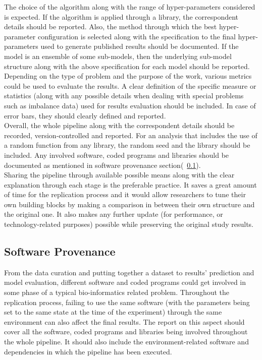     The choice of the algorithm along with the range of hyper-parameters considered is expected. If the algorithm is applied through 
    a library, the correspondent details should be reported. Also, the method through which the best hyper-parameter configuration 
    is selected along with the specification to the final hyper-parameters used to generate published results should be documented. 
    If the model is an ensemble of some sub-models, then the underlying sub-model structure along with the above specification for each model 
    should be reported.\\

    Depending on the type of problem and the purpose of the work, various metrics could be used to evaluate the results. 
    A clear definition of the specific measure or statistics (along with any possible details when dealing with special problems
    such as imbalance data) used for results evaluation should be included. In case of error bars, they should clearly defined and reported.\\

    Overall, the whole pipeline along with the correspondent details should be recorded, version-controlled and reported. For an analysis 
    that includes the use of a random function from any library, the random seed and the library should be included. Any involved 
    software, coded programs and libraries should be documented as mentioned in software provenance 
    section(~\ref{sec:softwareProvenance}).\\

    Sharing the pipeline through available possible means along with the clear explanation through each stage is the preferable practice. It 
    saves a great amount of time for the replication process and it would allow researchers to tune their own building blocks by 
    making a comparison in between their own structure and the original one. It also makes any further update (for performance, 
    or technology-related purposes) possible while preserving the original study results. 

    \subsection{Software Provenance}
    \label{sec:softwareProvenance}

    From the data curation and putting together a dataset to results' prediction and model evaluation, different software and coded programs 
    could get involved in some phase of a typical bio-informatics related problem. 
    Throughout the replication process, failing to use the same software (with the parameters 
    being set to the same state at the time of the experiment) through the same environment can also affect the final results. 
    The report on this aspect should cover all the software, coded programs and libraries being involved throughout the whole pipeline. 
    It should also include the environment-related software and dependencies in which the pipeline has been executed.\\

